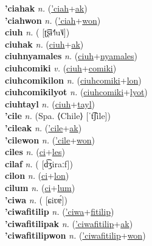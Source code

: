 \textbf{'ciahak} \textit{n.} (\hyperref['ciah]{'ciah}+\hyperref[ak]{ak})
 \label{'ciahak} \\
\textbf{'ciahwon} \textit{n.} (\hyperref['ciah]{'ciah}+\hyperref[won]{won})
 \label{'ciahwon} \\
\textbf{ciuh} \textit{n.} ( [ʈ͡ʂɨ˧˥u˥˩])
 \label{ciuh} \\
\textbf{ciuhak} \textit{n.} (\hyperref[ciuh]{ciuh}+\hyperref[ak]{ak})
 \label{ciuhak} \\
\textbf{ciuhnyamales} \textit{n.} (\hyperref[ciuh]{ciuh}+\hyperref[nyamales]{nyamales})
 \label{ciuhnyamales} \\
\textbf{ciuhcomiki} \textit{v.} (\hyperref[ciuh]{ciuh}+\hyperref[comiki]{comiki})
 \label{ciuhcomiki} \\
\textbf{ciuhcomikilon} \textit{n.} (\hyperref[ciuhcomiki]{ciuhcomiki}+\hyperref[lon]{lon})
 \label{ciuhcomikilon} \\
\textbf{ciuhcomikilyot} \textit{n.} (\hyperref[ciuhcomiki]{ciuhcomiki}+\hyperref[lyot]{lyot})
 \label{ciuhcomikilyot} \\
\textbf{ciuhtayl} \textit{n.} (\hyperref[ciuh]{ciuh}+\hyperref[tayl]{tayl})
 \label{ciuhtayl} \\
\textbf{'cile} \textit{n.} (Spa. ⟨Chile⟩ [ˈt͡ʃile])
 \label{'cile} \\
\textbf{'cileak} \textit{n.} (\hyperref['cile]{'cile}+\hyperref[ak]{ak})
 \label{'cileak} \\
\textbf{'cilewon} \textit{n.} (\hyperref['cile]{'cile}+\hyperref[won]{won})
 \label{'cilewon} \\
\textbf{ciles} \textit{n.} (\hyperref[ci]{ci}+\hyperref[les]{les})
 \label{ciles} \\
\textbf{cilaf} \textit{n.} ( [d͡ʒiraːf])
 \label{cilaf} \\
\textbf{cilon} \textit{n.} (\hyperref[ci]{ci}+\hyperref[lon]{lon})
 \label{cilon} \\
\textbf{cilum} \textit{n.} (\hyperref[ci]{ci}+\hyperref[lum]{lum})
 \label{cilum} \\
\textbf{'ciwa} \textit{n.} ( [ɕiʋɐ́])
 \label{'ciwa} \\
\textbf{'ciwafitilip} \textit{n.} (\hyperref['ciwa]{'ciwa}+\hyperref[fitilip]{fitilip})
 \label{'ciwafitilip} \\
\textbf{'ciwafitilipak} \textit{n.} (\hyperref['ciwafitilip]{'ciwafitilip}+\hyperref[ak]{ak})
 \label{'ciwafitilipak} \\
\textbf{'ciwafitilipwon} \textit{n.} (\hyperref['ciwafitilip]{'ciwafitilip}+\hyperref[won]{won})
